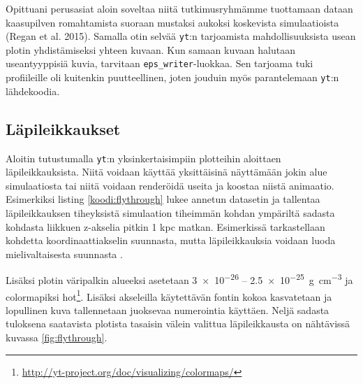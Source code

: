 \documentclass[12pt,a4paper]{article}
\newcommand{\yt}{\texttt{yt}}
\begin{document}
Opittuani perusasiat aloin soveltaa niitä tutkimusryhmämme tuottamaan dataan kaasupilven romahtamista suoraan mustaksi aukoksi koskevista simulaatioista (Regan et al. 2015). Samalla otin selvää \yt :n tarjoamista mahdollisuuksista usean plotin yhdistämiseksi yhteen kuvaan. Kun samaan kuvaan halutaan useantyyppisiä kuvia, tarvitaan \texttt{eps\_writer}-luokkaa. Sen tarjoama tuki profiileille oli kuitenkin puutteellinen, joten jouduin myös parantelemaan \yt :n lähdekoodia.

\subsection{Läpileikkaukset}
Aloitin tutustumalla \yt :n yksinkertaisimpiin plotteihin aloittaen läpileikkauksista. Niitä voidaan käyttää yksittäisinä näyttämään jokin alue simulaatiosta tai niitä voidaan renderöidä useita ja koostaa niistä animaatio. Esimerkiksi listing \ref{koodi:flythrough} lukee annetun datasetin ja tallentaa läpileikkauksen tiheyksistä simulaation tiheimmän kohdan ympäriltä sadasta kohdasta liikkuen z-akselia pitkin 1 kpc matkan. Esimerkissä tarkastellaan kohdetta koordinaattiakselin suunnasta, mutta läpileikkauksia voidaan luoda mielivaltaisesta suunnasta \cite{sliceproj}.

Lisäksi plotin väripalkin alueeksi asetetaan \SI{3e-26}{} -- \SI{2.5e-25}{\gram\per\cubic\centi\metre} %
ja colormapiksi hot\footnote{\url{http://yt-project.org/doc/visualizing/colormaps/}}. Lisäksi akseleilla käytettävän fontin kokoa kasvatetaan ja lopullinen kuva tallennetaan juoksevaa numerointia käyttäen. Neljä sadasta tuloksena saatavista plotista tasaisin välein valittua läpileikkausta on nähtävissä kuvassa \ref{fig:flythrough}.

\begin{minipage}{\linewidth}

\end{minipage}
\end{document}
